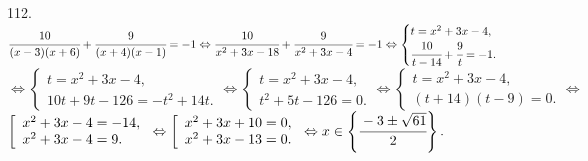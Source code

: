 112. $\cfrac{10}{(x-3)(x+6)}+\cfrac{9}{(x+4)(x-1)}=-1\Leftrightarrow
\cfrac{10}{x^2+3x-18}+\cfrac{9}{x^2+3x-4}=-1\Leftrightarrow\begin{cases} t=x^2+3x-4,\\ \cfrac{10}{t-14}+\cfrac{9}{t}=-1.\end{cases}$\\
$\Leftrightarrow\begin{cases} t=x^2+3x-4,\\ 10t+9t-126=-t^2+14t.\end{cases}
\Leftrightarrow\begin{cases} t=x^2+3x-4,\\ t^2+5t-126=0.\end{cases}
\Leftrightarrow\begin{cases} t=x^2+3x-4,\\ (t+14)(t-9)=0.\end{cases}
\Leftrightarrow$\\$\left[\begin{array}{l}x^2+3x-4=-14,\\ x^2+3x-4=9.\end{array}\right.
\Leftrightarrow\left[\begin{array}{l}x^2+3x+10=0,\\ x^2+3x-13=0.\end{array}\right.
\Leftrightarrow x\in\left\{\cfrac{-3\pm\sqrt{61}}{2}\right\}.$\\
